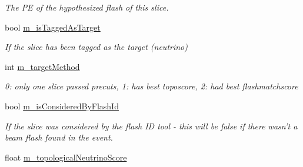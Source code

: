 \begin{DoxyCompactItemize}
\begin{DoxyCompactList}\small\item\em The P\-E of the hypothesized flash of this slice. \end{DoxyCompactList}\item 
\hypertarget{classflashmatch_1_1FlashMatchingTool_1_1SliceCandidate_a0122dfd452b75e98197ed203f39c1a69}{bool \hyperlink{classflashmatch_1_1FlashMatchingTool_1_1SliceCandidate_a0122dfd452b75e98197ed203f39c1a69}{m\-\_\-is\-Tagged\-As\-Target}}\label{classflashmatch_1_1FlashMatchingTool_1_1SliceCandidate_a0122dfd452b75e98197ed203f39c1a69}

\begin{DoxyCompactList}\small\item\em If the slice has been tagged as the target (neutrino) \end{DoxyCompactList}\item 
\hypertarget{classflashmatch_1_1FlashMatchingTool_1_1SliceCandidate_a8a779ab73fe1fedf1db38b7ed2dd0a55}{int \hyperlink{classflashmatch_1_1FlashMatchingTool_1_1SliceCandidate_a8a779ab73fe1fedf1db38b7ed2dd0a55}{m\-\_\-target\-Method}}\label{classflashmatch_1_1FlashMatchingTool_1_1SliceCandidate_a8a779ab73fe1fedf1db38b7ed2dd0a55}

\begin{DoxyCompactList}\small\item\em 0\-: only one slice passed precuts, 1\-: has best toposcore, 2\-: had best flashmatchscore \end{DoxyCompactList}\item 
\hypertarget{classflashmatch_1_1FlashMatchingTool_1_1SliceCandidate_a7ccdb127b52a9eb771c643b5623aab28}{bool \hyperlink{classflashmatch_1_1FlashMatchingTool_1_1SliceCandidate_a7ccdb127b52a9eb771c643b5623aab28}{m\-\_\-is\-Considered\-By\-Flash\-Id}}\label{classflashmatch_1_1FlashMatchingTool_1_1SliceCandidate_a7ccdb127b52a9eb771c643b5623aab28}

\begin{DoxyCompactList}\small\item\em If the slice was considered by the flash I\-D tool -\/ this will be false if there wasn't a beam flash found in the event. \end{DoxyCompactList}\item 
\hypertarget{classflashmatch_1_1FlashMatchingTool_1_1SliceCandidate_abbee3a2198d42d640e8087aed1eef6fe}{float \hyperlink{classflashmatch_1_1FlashMatchingTool_1_1SliceCandidate_abbee3a2198d42d640e8087aed1eef6fe}{m\-\_\-topological\-Neutrino\-Score}}\label{classflashmatch_1_1FlashMatchingTool_1_1SliceCandidate_abbee3a2198d42d640e8087aed1eef6fe}


\end{DoxyCompactItemize}
